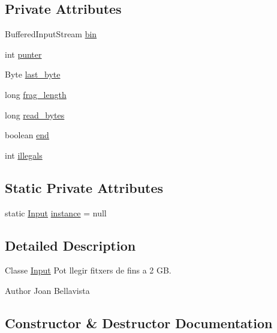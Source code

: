 \subsection*{Private Attributes}
\begin{DoxyCompactItemize}
\item 
Buffered\+Input\+Stream \hyperlink{classpersistencia_1_1input_1_1Input_aa4b622d30a090256ce05c5082cdb0791}{bin}
\item 
int \hyperlink{classpersistencia_1_1input_1_1Input_abe76388d0ac9eeafdba673ad2138f8dc}{punter}
\item 
Byte \hyperlink{classpersistencia_1_1input_1_1Input_a45d4bdcdb96823fc8ffe5c1a430727f2}{last\+\_\+byte}
\item 
long \hyperlink{classpersistencia_1_1input_1_1Input_adae91120899054fe5200d5e307840042}{frag\+\_\+length}
\item 
long \hyperlink{classpersistencia_1_1input_1_1Input_ace2c934234f82fb07ae169b50f71cd32}{read\+\_\+bytes}
\item 
boolean \hyperlink{classpersistencia_1_1input_1_1Input_aa986cd4af0178e1a80f551dcd8936125}{end}
\item 
int \hyperlink{classpersistencia_1_1input_1_1Input_ad3132949d4ac469b5f4d77373389f9f1}{illegals}
\end{DoxyCompactItemize}
\subsection*{Static Private Attributes}
\begin{DoxyCompactItemize}
\item 
static \hyperlink{classpersistencia_1_1input_1_1Input}{Input} \hyperlink{classpersistencia_1_1input_1_1Input_a2e516b1cbef9b704c10fd932b3d11afd}{instance} = null
\end{DoxyCompactItemize}


\subsection{Detailed Description}
Classe \hyperlink{classpersistencia_1_1input_1_1Input}{Input} Pot llegir fitxers de fins a 2 GB. 

\begin{DoxyAuthor}{Author}
Joan Bellavista 
\end{DoxyAuthor}


\subsection{Constructor \& Destructor Documentation}
\mbox{\label{classpersistencia_1_1input_1_1Input_a9b30ef8d489a1fc5b4aa04a14474349a}} 
